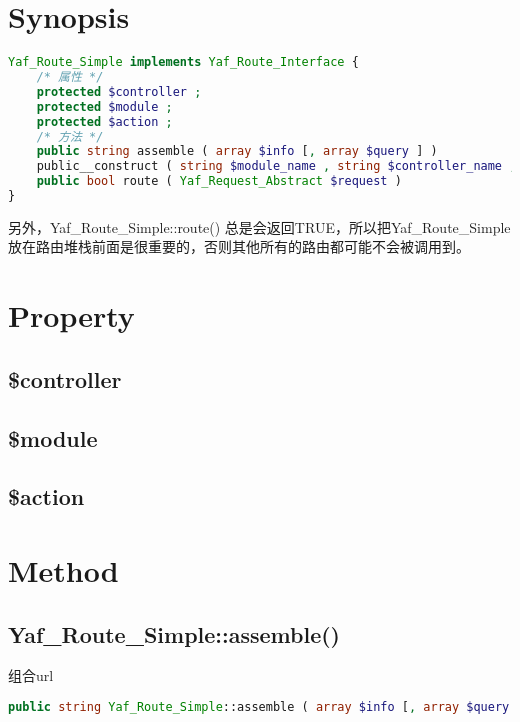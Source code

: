 \section{Synopsis}

\begin{lstlisting}[language=PHP]
Yaf_Route_Simple implements Yaf_Route_Interface {
    /* 属性 */
    protected $controller ;
    protected $module ;
    protected $action ;
    /* 方法 */
    public string assemble ( array $info [, array $query ] )
    public__construct ( string $module_name , string $controller_name , string $action_name )
    public bool route ( Yaf_Request_Abstract $request )
}
\end{lstlisting}


另外，Yaf\_Route\_Simple::route() 总是会返回TRUE，所以把Yaf\_Route\_Simple放在路由堆栈前面是很重要的，否则其他所有的路由都可能不会被调用到。


\section{Property}

\subsection{\$controller}


\subsection{\$module}


\subsection{\$action}


\section{Method}


\subsection{Yaf\_Route\_Simple::assemble()}

组合url





\begin{lstlisting}[language=PHP]
public string Yaf_Route_Simple::assemble ( array $info [, array $query ] )
\end{lstlisting}

